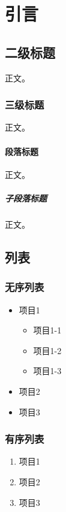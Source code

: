 \section{引言}\label{sec:introduction}

\subsection{二级标题}

正文。

\subsubsection{三级标题}

正文。

\paragraph{段落标题}

正文。

\subparagraph{子段落标题}

正文。

\subsection{列表}

\subsubsection{无序列表}

\begin{itemize}
    \item 项目1
          \begin{itemize}
              \item 项目1-1
              \item 项目1-2
              \item 项目1-3
          \end{itemize}
    \item 项目2
    \item 项目3
\end{itemize}

\subsubsection{有序列表}

\begin{enumerate}
    \item 项目1
    \item 项目2
    \item 项目3
\end{enumerate}

